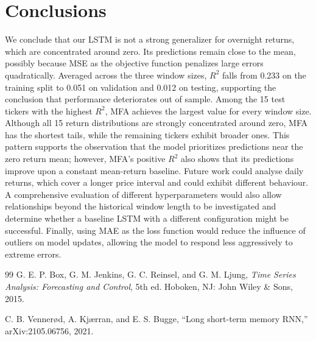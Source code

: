 \documentclass[12pt,a4paper]{article}
\begin{document}
\section{Conclusions}
We conclude that our LSTM is not a strong generalizer for overnight returns,
which are concentrated around zero. Its predictions remain close to the mean,
possibly because MSE as the objective function penalizes large errors
quadratically. Averaged across the three window sizes, $R^2$ falls from 0.233
on the training split to 0.051 on validation and 0.012 on testing, supporting
the conclusion that performance deteriorates out of sample. Among the 15 test
tickers with the highest $R^2$, MFA achieves the largest value for every window
size. Although all 15 return distributions are strongly concentrated around
zero, MFA has the shortest tails, while the remaining tickers exhibit broader
ones. This pattern supports the observation that the model prioritizes
predictions near the zero return mean; however, MFA's positive $R^2$ also shows
that its predictions improve upon a constant mean-return baseline. Future work
could analyse daily returns, which cover a longer
price interval and could exhibit different behaviour. A comprehensive
evaluation of different hyperparameters would also allow relationships beyond
the historical window length to be investigated and determine whether a
baseline LSTM with a different configuration might be successful. Finally,
using MAE as the loss function would reduce the influence of outliers on model
updates, allowing the model to respond less aggressively to extreme errors.

\begin{thebibliography}{99}
G. E. P. Box, G. M. Jenkins, G. C. Reinsel, and G. M. Ljung,
\textit{Time Series Analysis: Forecasting and Control}, 5th ed.
Hoboken, NJ: John Wiley \& Sons, 2015.

C. B. Venner{\o}d, A. Kj{\ae}rran, and E. S. Bugge,
``Long short-term memory RNN,'' arXiv:2105.06756, 2021.
\end{thebibliography}
\end{document}
